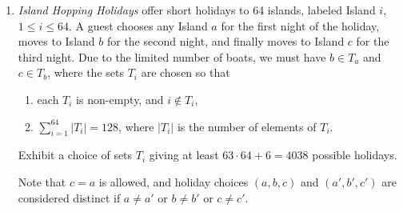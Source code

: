 \documentclass[12pt]{article}
\begin{document}
\begin{enumerate}
\item \textit{Island Hopping Holidays} offer short holidays to 64 islands, labeled Island $i$, $1 \le i \le 64$. A guest chooses any Island $a$ for the first night of the holiday, moves to Island $b$ for the second night, and finally moves to Island $c$ for the third night. Due to the limited number of boats, we must have $b \in T_a$ and $c \in T_b$, where the sets $T_i$ are chosen so that
\begin{enumerate}
\item[(a)] each $T_i$ is non-empty, and $i \notin T_i$,
\item[(b)] $\sum_{i=1}^{64} |T_i| = 128$, where $|T_i|$ is the number of elements of $T_i$.
\end{enumerate}
Exhibit a choice of sets $T_i$ giving at least $63 \cdot 64 + 6 = 4038$ possible holidays.

Note that $c = a$ is allowed, and holiday choices $(a, b, c)$ and $(a', b', c')$ are considered distinct if $a \ne a'$ or $b \ne b'$ or $c \ne c'$.
\end{enumerate}
\end{document}

